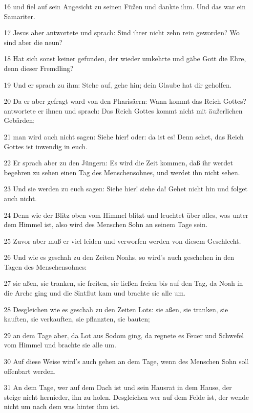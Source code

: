 \par 16 und fiel auf sein Angesicht zu seinen Füßen und dankte ihm. Und das war ein Samariter.
\par 17 Jesus aber antwortete und sprach: Sind ihrer nicht zehn rein geworden? Wo sind aber die neun?
\par 18 Hat sich sonst keiner gefunden, der wieder umkehrte und gäbe Gott die Ehre, denn dieser Fremdling?
\par 19 Und er sprach zu ihm: Stehe auf, gehe hin; dein Glaube hat dir geholfen.
\par 20 Da er aber gefragt ward von den Pharisäern: Wann kommt das Reich Gottes? antwortete er ihnen und sprach: Das Reich Gottes kommt nicht mit äußerlichen Gebärden;
\par 21 man wird auch nicht sagen: Siehe hier! oder: da ist es! Denn sehet, das Reich Gottes ist inwendig in euch.
\par 22 Er sprach aber zu den Jüngern: Es wird die Zeit kommen, daß ihr werdet begehren zu sehen einen Tag des Menschensohnes, und werdet ihn nicht sehen.
\par 23 Und sie werden zu euch sagen: Siehe hier! siehe da! Gehet nicht hin und folget auch nicht.
\par 24 Denn wie der Blitz oben vom Himmel blitzt und leuchtet über alles, was unter dem Himmel ist, also wird des Menschen Sohn an seinem Tage sein.
\par 25 Zuvor aber muß er viel leiden und verworfen werden von diesem Geschlecht.
\par 26 Und wie es geschah zu den Zeiten Noahs, so wird's auch geschehen in den Tagen des Menschensohnes:
\par 27 sie aßen, sie tranken, sie freiten, sie ließen freien bis auf den Tag, da Noah in die Arche ging und die Sintflut kam und brachte sie alle um.
\par 28 Desgleichen wie es geschah zu den Zeiten Lots: sie aßen, sie tranken, sie kauften, sie verkauften, sie pflanzten, sie bauten;
\par 29 an dem Tage aber, da Lot aus Sodom ging, da regnete es Feuer und Schwefel vom Himmel und brachte sie alle um.
\par 30 Auf diese Weise wird's auch gehen an dem Tage, wenn des Menschen Sohn soll offenbart werden.
\par 31 An dem Tage, wer auf dem Dach ist und sein Hausrat in dem Hause, der steige nicht hernieder, ihn zu holen. Desgleichen wer auf dem Felde ist, der wende nicht um nach dem was hinter ihm ist.
